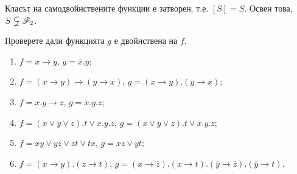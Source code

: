 \begin{prop}
  Класът на самодвойнствените функции е затворен, т.е. $[S] = S$.
  Освен това, $S \subsetneqq \mathscr{F}_2$.
\end{prop}


\begin{problem} %
  Проверете дали функцията $g$ е двойнствена на $f$.
  \begin{enumerate}[1)]
  \item
    $f = x\rightarrow y$, $g = \overline{x}.y$;
  \item
    $f = (\overline{x}\rightarrow\overline{y})\rightarrow(y\rightarrow x)$, $g = (x\rightarrow y).(\overline{y}\rightarrow\overline{x})$;
  \item
    $f = x.y \rightarrow z$, $g = \overline{x}.\overline{y}.z$;
  \item
    $f = (x\vee y\vee z).t\vee x.y.z$, $g = (x\vee y\vee z).t\vee x.y.z$;
  \item
    $f = xy\vee yz\vee zt\vee tx$, $g = xz\vee yt$;
  \item
    $f = (x\rightarrow y).(z\rightarrow t)$, $g = (x\rightarrow\overline{z}).(x\rightarrow t).(\overline{y}\rightarrow\overline{z}).(\overline{y}\rightarrow t)$.
  \end{enumerate}
\end{problem}

